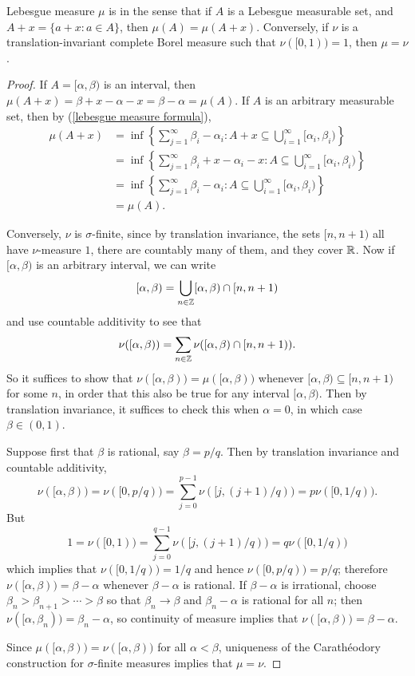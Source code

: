 \begin{theorem}\label{translation invariance in R1}
Lebesgue measure $\mu$ is  in the sense that if $A$ is a Lebesgue measurable set, and $A + x = \{a + x: a \in A\}$, then $\mu(A) = \mu(A + x)$.
Conversely, if $\nu$ is a translation-invariant complete Borel measure such that $\nu([0, 1)) = 1$, then $\mu = \nu$.
\end{theorem}
\begin{proof}
If $A = [\alpha, \beta)$ is an interval, then $\mu(A + x) = \beta + x - \alpha - x = \beta - \alpha = \mu(A)$.
If $A$ is an arbitrary measurable set, then by (\ref{lebesgue measure formula}),
\begin{align*}
\mu(A + x) &= \inf \left\{\sum_{j=1}^{\infty} \beta_{i} - \alpha_{i}: A + x\subseteq \bigcup_{i=1}^{\infty} [\alpha_{i}, \beta_{i})\right\} \\
&= \inf \left\{\sum_{j=1}^{\infty} \beta_{i} + x- \alpha_{i} - x: A \subseteq \bigcup_{i=1}^{\infty} [\alpha_{i}, \beta_{i})\right\}\\
&= \inf \left\{\sum_{j=1}^{\infty} \beta_{i} - \alpha_{i}: A \subseteq \bigcup_{i=1}^{\infty} [\alpha_{i}, \beta_{i})\right\}\\
&= \mu(A).
\end{align*}

Conversely, $\nu$ is $\sigma$-finite, since by translation invariance, the sets $[n, n + 1)$ all have $\nu$-measure $1$, there are countably many of them, and they cover $\mathbb{R}$.
Now if $[\alpha, \beta)$ is an arbitrary interval, we can write
\[[\alpha, \beta) = \bigcup_{n\in\mathbb{Z}} [\alpha, \beta) \cap [n, n + 1)\]
and use countable additivity to see that
\[\nu([\alpha, \beta)) = \sum_{n\in\mathbb{Z}} \nu([\alpha, \beta) \cap [n, n + 1)).\]
So it suffices to show that $\nu([\alpha, \beta)) = \mu([\alpha, \beta))$ whenever $[\alpha, \beta) \subseteq [n, n + 1)$ for some $n$, in order that this also be true for any interval $[\alpha, \beta)$.
Then by translation invariance, it suffices to check this when $\alpha = 0$, in which case $\beta \in (0, 1)$.

Suppose first that $\beta$ is rational, say $\beta = p/q$. Then by translation invariance and countable additivity,
\[\nu([\alpha, \beta)) = \nu([0, p/q)) = \sum_{j=0}^{p-1} \nu([j, (j+1)/q)) = p\nu([0, 1/q)).\]
But
\[1 = \nu([0, 1)) = \sum_{j=0}^{q-1} \nu([j, (j+1)/q)) = q\nu([0, 1/q))\]
which implies that $\nu([0, 1/q)) = 1/q$ and hence $\nu([0, p/q)) = p/q$; therefore $\nu([\alpha, \beta)) = \beta - \alpha$ whenever $\beta - \alpha$ is rational.
If $\beta - \alpha$ is irrational, choose $\beta_{n} > \beta_{n+1} > \cdots > \beta$ so that $\beta_{n} \to \beta$ and $\beta_{n} - \alpha$ is rational for all $n$; then $\nu([\alpha, \beta_{n})) = \beta_{n} - \alpha$, so continuity of measure implies that $\nu([\alpha, \beta)) = \beta - \alpha$.

Since $\mu([\alpha, \beta)) = \nu([\alpha, \beta))$ for all $\alpha < \beta$, uniqueness of the Carathéodory construction for $\sigma$-finite measures implies that $\mu = \nu$.
\end{proof}

